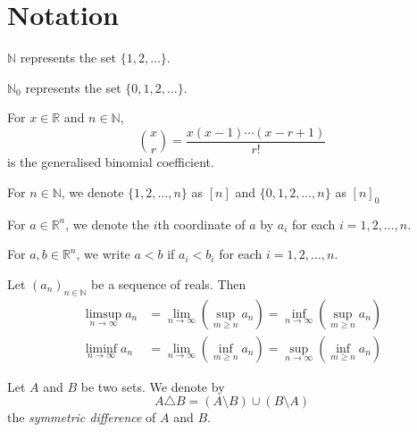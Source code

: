 \section{Notation}

$\mathbb{N}$ represents the set $\{1,2,\ldots\}$.

\vspace{1mm}
$\mathbb{N}_0$ represents the set $\{0,1,2,\ldots\}$.

\vspace{1mm}
For $x\in\mathbb{R}$ and $n\in\mathbb{N}$,
$$\binom{x}{r}=\frac{x(x-1)\cdots(x-r+1)}{r!}$$
is the generalised binomial coefficient.

\vspace{2mm}
For $n\in\mathbb{N}$, we denote $\{1,2,\ldots,n\}$ as $[n]$ and $\{0,1,2,\ldots,n\}$ as $[n]_0$

\vspace{2mm}
For $a\in\mathbb{R}^n$, we denote the $i$th coordinate of $a$ by $a_i$ for each $i=1,2,\ldots,n$.

\vspace{1mm}
For $a,b\in\mathbb{R}^n$, we write $a<b$ if $a_i<b_i$ for each $i=1,2,\ldots,n$.

\vspace{2mm}
Let $(a_n)_{n\in\mathbb{N}}$ be a sequence of reals. Then
\begin{align*}
    \limsup_{n\to\infty}a_n &= \lim_{n\to\infty}\left(\sup_{m\geq n}a_n\right) =    \inf_{n\to\infty}\left(\sup_{m\geq n}a_n\right) \\
    \liminf_{n\to\infty}a_n &= \lim_{n\to\infty}\left(\inf_{m\geq n}a_n\right) =    \sup_{n\to\infty}\left(\inf_{m\geq n}a_n\right)
\end{align*}

\vspace{2mm}
Let $A$ and $B$ be two sets. We denote by
$$A\triangle B=(A\setminus B)\cup(B\setminus A)$$
the \textit{symmetric difference} of $A$ and $B$.

\clearpage